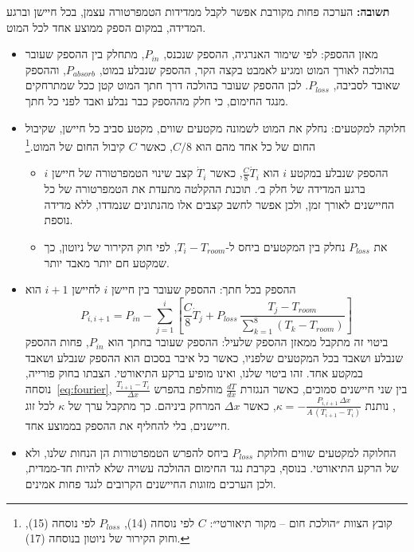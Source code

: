 \documentclass[10pt,a4paper]{article}
\begin{document}
\textbf{תשובה:} הערכה פחות מקורבת אפשר לקבל ממדידות הטמפרטורה עצמן, בכל חיישן וברגע המדידה, במקום הספק ממוצע אחד לכל המוט.
\begin{itemize}\setlength{\itemsep}{2pt}\setlength{\parskip}{0pt}
  \item מאזן ההספק: לפי שימור האנרגיה, ההספק שנכנס, $P_{in}$, מתחלק בין ההספק שעובר בהולכה לאורך המוט ומגיע לאמבט בקצה הקר, ההספק שנבלע במוט, $P_{absorb}$, וההספק שאובד לסביבה, $P_{loss}$. לכן ההספק שעובר בהולכה דרך חתך המוט קטן ככל שמתרחקים מנגד החימום, כי חלק מההספק כבר נבלע ואבד לפני כל חתך.
  \item חלוקה למקטעים: נחלק את המוט לשמונה מקטעים שווים, מקטע סביב כל חיישן, שקיבול החום של כל אחד מהם הוא $C/8$, כאשר $C$ קיבול החום של המוט.\footnote{קובץ הצוות ״הולכת חום -- מקור תיאורטי״: $C$ לפי נוסחה (14), $P_{loss}$ לפי נוסחה (15), וחוק הקירור של ניוטון בנוסחה (17).}
  \begin{itemize}\setlength{\itemsep}{0pt}\setlength{\parskip}{0pt}
    \item ההספק שנבלע במקטע $i$ הוא $\frac{C}{8}\dot{T}_i$, כאשר $\dot{T}_i$ קצב שינוי הטמפרטורה של חיישן $i$ ברגע המדידה של חלק ב׳. תוכנת ההקלטה מתעדת את הטמפרטורה של כל החיישנים לאורך זמן, ולכן אפשר לחשב קצבים אלו מהנתונים שנמדדו, ללא מדידה נוספת.
    \item את $P_{loss}$ נחלק בין המקטעים ביחס ל-$T_i - T_{room}$, לפי חוק הקירור של ניוטון, כך שמקטע חם יותר מאבד יותר.
  \end{itemize}
  \item ההספק בכל חתך: ההספק שעובר בין חיישן $i$ לחיישן $i+1$ הוא
  \[P_{i,i+1} = P_{in} - \sum_{j=1}^{i}\left[\frac{C}{8}\dot{T}_j + P_{loss}\,\frac{T_j - T_{room}}{\sum_{k=1}^{8}(T_k - T_{room})}\right]\]
  ביטוי זה מתקבל ממאזן ההספק שלעיל: ההספק שעובר בחתך הוא $P_{in}$, פחות ההספק שנבלע ושאבד בכל המקטעים שלפניו, כאשר כל איבר בסכום הוא ההספק שנבלע ושאבד במקטע אחד. זהו ביטוי שלנו, ואינו מופיע ברקע התיאורטי. הצבתו בחוק פורייה, נוסחה~\eqref{eq:fourier}, בין שני חיישנים סמוכים, כאשר הנגזרת $\frac{dT}{dx}$ מוחלפת בהפרש $\frac{T_{i+1} - T_i}{\Delta x}$, נותנת $\kappa = -\frac{P_{i,i+1}\,\Delta x}{A\,(T_{i+1} - T_i)}$, כאשר $\Delta x$ המרחק ביניהם. כך מתקבל ערך של $\kappa$ לכל זוג חיישנים, בלי להחליף את ההספק בממוצע אחד.
  \item החלוקה למקטעים שווים וחלוקת $P_{loss}$ ביחס להפרש הטמפרטורות הן הנחות שלנו, ולא של הרקע התיאורטי. בנוסף, בקרבת נגד החימום ההולכה עשויה שלא להיות חד-ממדית, ולכן הערכים מזוגות החיישנים הקרובים לנגד פחות אמינים.
\end{itemize}
\end{document}
